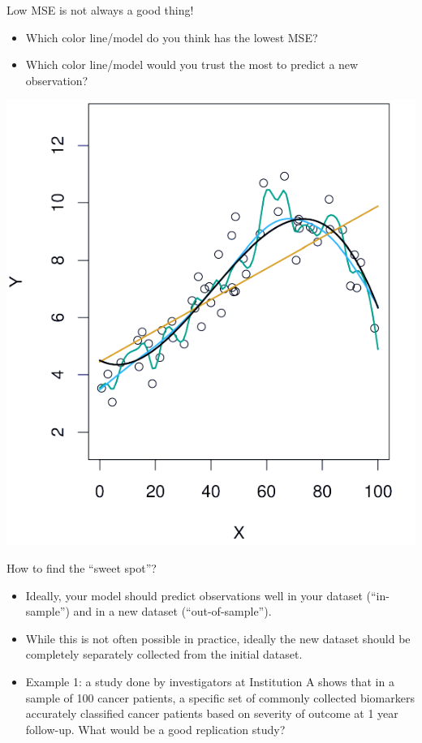 \documentclass[table]{beamer}\usepackage[]{graphicx}\usepackage[]{color}
\begin{document}
\begin{frame}{Low MSE is not always a good thing!}
\begin{itemize}
  \item Which color line/model do you think has the lowest MSE?
  \item Which color line/model would you trust the most to predict a new observation?
\end{itemize}

\centerline{
\includegraphics[scale=.6,angle=0]{figure-static/2_9-half.pdf}
}


\end{frame}


\begin{frame}{How to find the ``sweet spot''?}
\begin{itemize}
  \item Ideally, your model should predict observations well in your dataset (``in-sample'') and in a new dataset (``out-of-sample''). 
  \item While this is not often possible in practice, ideally the new dataset should be completely separately collected from the initial dataset.
  \item Example 1: a study done by investigators at Institution A shows that in a sample of 100 cancer patients, a specific set of commonly collected biomarkers accurately classified cancer patients based on severity of outcome at 1 year follow-up. What would be a good replication study?
\end{itemize}
\end{frame}
\end{document}
